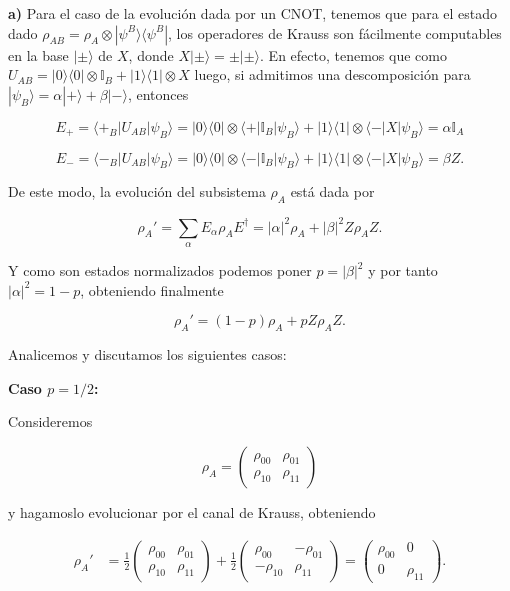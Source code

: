 \documentclass[12pt]{article}
\makeatletter
\theoremstyle{definition}\@ifundefined{exercise}{\newtheorem{exercise}{Ejercicio}}{}%
\makeatother
\begin{document}
\begin{exercise}
        \textbf{a)} Para el caso de la evolución dada por un CNOT, tenemos que para el estado dado $\rho_{AB}=\rho_A \otimes|\psi^B\rangle\langle\psi^B|$, los operadores de Krauss son fácilmente computables en la base $|\pm\rangle$ de $X$, donde $X|\pm\rangle=\pm |\pm \rangle$.
En efecto, tenemos que como $U_{AB}=|0\rangle\langle 0|\otimes \mathbb{I}_B + |1\rangle\langle 1|\otimes X$ luego, si admitimos una descomposición para $|\psi_B\rangle = \alpha |+\rangle + \beta |-\rangle$, entonces

$$E_+= \langle+_B|U_{AB}|\psi_B\rangle = |0\rangle\langle 0|\otimes \langle+|\mathbb{I}_B|\psi_B\rangle + |1\rangle\langle 1| \otimes \langle-|X|\psi_B\rangle = \alpha \mathbb{I}_A $$

$$E_-= \langle-_B|U_{AB}|\psi_B\rangle = |0\rangle\langle 0|\otimes \langle-|\mathbb{I}_B|\psi_B\rangle + |1\rangle\langle 1| \otimes \langle-|X|\psi_B\rangle = \beta Z. $$

De este modo, la evolución del subsistema $\rho_A$ está dada por

$$\rho_A'=\sum_\alpha E_\alpha\rho_AE^{\dagger}= |\alpha|^2 \rho_A + |\beta|^2 Z\rho_AZ. $$

Y como son estados normalizados podemos poner $p=|\beta|^2$ y por tanto $|\alpha|^2=1-p$, obteniendo finalmente

$$\rho_A'=(1-p)\rho_A + p Z\rho_AZ. $$

Analicemos y discutamos los siguientes casos:

\textbf{Caso $p=1/2$:}

Consideremos 

\begin{equation}\label{rhoA}
  \rho_A = \begin{pmatrix}
    \rho_{00} & \rho_{01} \\
    \rho_{10} & \rho_{11}
\end{pmatrix}
\end{equation}

y hagamoslo evolucionar por el canal de Krauss, obteniendo

\begin{align*}
    \rho_A' &= \frac{1}{2}\begin{pmatrix}
        \rho_{00} & \rho_{01} \\
        \rho_{10} & \rho_{11}
    \end{pmatrix} + \frac{1}{2}\begin{pmatrix}
        \rho_{00} & -\rho_{01} \\
        -\rho_{10} & \rho_{11}
    \end{pmatrix} = \begin{pmatrix}
        \rho_{00} & 0 \\
        0 & \rho_{11}
    \end{pmatrix}.
\end{align*}


\end{exercise}
\end{document}
